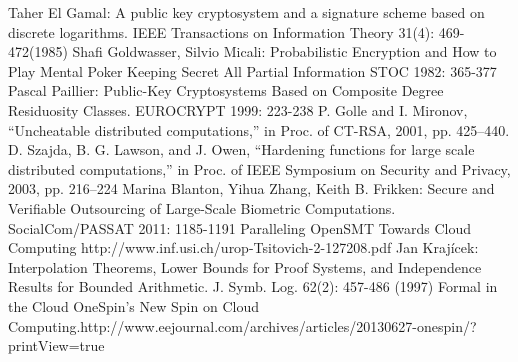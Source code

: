 \documentclass[runningheads,a4paper]{llncs}
\begin{document}
\newline[29]	Taher El Gamal: A public key cryptosystem and a signature scheme based on discrete logarithms. IEEE Transactions on Information Theory 31(4): 469-472(1985)
\newline[30]	Shafi Goldwasser, Silvio Micali: Probabilistic Encryption and How to Play Mental Poker Keeping Secret All Partial Information STOC 1982: 365-377
\newline[31]	Pascal Paillier: Public-Key Cryptosystems Based on Composite Degree Residuosity Classes. EUROCRYPT 1999: 223-238
\newline[32]	P. Golle and I. Mironov, “Uncheatable distributed computations,” in Proc. of CT-RSA, 2001, pp. 425–440.
\newline[33]	D. Szajda, B. G. Lawson, and J. Owen, “Hardening functions for large scale distributed computations,” in Proc. of IEEE Symposium on Security and Privacy, 2003, pp. 216–224
\newline[34]	Marina Blanton, Yihua Zhang, Keith B. Frikken: Secure and Verifiable Outsourcing of Large-Scale Biometric Computations. SocialCom/PASSAT 2011: 1185-1191
\newline[35]	Paralleling OpenSMT Towards Cloud Computing http://www.inf.usi.ch/urop-Tsitovich-2-127208.pdf‎
\newline[36]	Jan Krajícek: Interpolation Theorems, Lower Bounds for Proof Systems, and Independence Results for Bounded Arithmetic. J. Symb. Log. 62(2): 457-486 (1997)
\newline[37]	Formal in the Cloud OneSpin’s New Spin on Cloud Computing.http://www.eejournal.com/archives/articles/20130627-onespin/?printView=true
\end{document}
